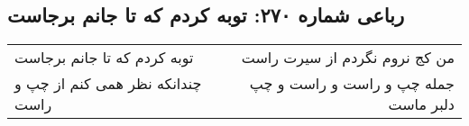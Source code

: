 \begin{center}
\section*{رباعی شماره ۲۷۰: توبه کردم که تا جانم برجاست}
\label{sec:0270}
\begin{longtable}{l p{0.5cm} r}
توبه کردم که تا جانم برجاست
&&
من کج نروم نگردم از سیرت راست
\\
چندانکه نظر همی کنم از چپ و راست
&&
جمله چپ و راست و راست و چپ دلبر ماست
\\
\end{longtable}
\end{center}
